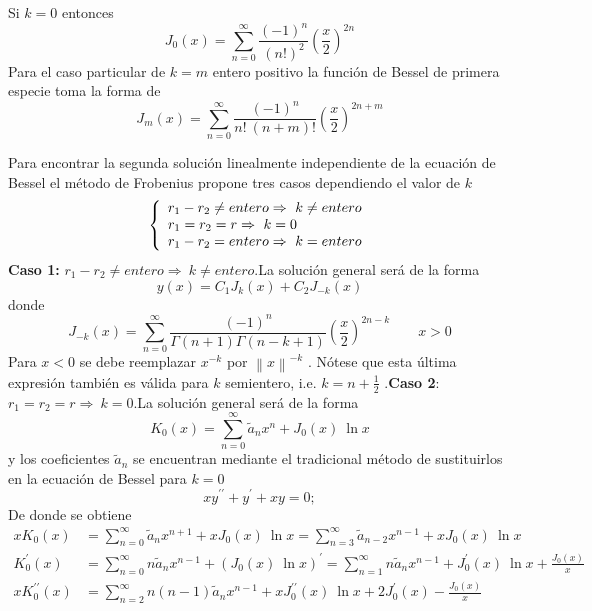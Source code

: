 \documentclass[spanish,notitlepage,letterpaper,12pt]{article}
\begin{document}
Si $k=0$ entonces
\[
J_{0}(x)=\sum_{n=0}^{\infty}\frac{\left(  -1\right)  ^{n}}{\left(  n!\right)
^{2}}\left(  \frac x2\right)  ^{2n}
\]
Para el caso particular de $k=m$ entero positivo la funci\'{o}n de Bessel de
primera especie toma la forma de
\[
J_{m}(x)=\sum_{n=0}^{\infty}\frac{\left(  -1\right)  ^{n}}{n!\ \left(
n+m\right)  !}\left(  \frac x2\right)  ^{2n+m}
\]

Para encontrar la segunda soluci\'{o}n linealmente independiente de la
ecuaci\'{o}n de Bessel el m\'{e}todo de Frobenius propone tres casos
dependiendo el valor de $k$%
\[
\left\{
\begin{array}
[c]{l}%
r_{1}-r_{2}\neq entero\Rightarrow\ k\neq entero\\
r_{1}=r_{2}=r\Rightarrow\ k=0\\
r_{1}-r_{2}=entero\Rightarrow\ k=entero
\end{array}
\right.
\]
\textbf{Caso 1:} $r_{1}-r_{2}\neq entero\Rightarrow\ k\neq entero.$\newline La
soluci\'{o}n general ser\'{a} de la forma
\[
y(x)=C_{1}J_{k}(x)+C_{2}J_{-k}(x)
\]
donde
\[
J_{-k}(x)=\sum_{n=0}^{\infty}\frac{\left(  -1\right)  ^{n}}{\Gamma\left(
n+1\right)  \Gamma\left(  n-k+1\right)  }\left(  \frac x2\right)
^{2n-k}\qquad x>0
\]
Para $x<0$ se debe reemplazar $x^{-k}$ por $\left\|  x\right\|  ^{-k}$ .
N\'{o}tese que esta \'{u}ltima expresi\'{o}n tambi\'{e}n es v\'{a}lida para
$k$ semientero, i.e. $k=n+\frac12$ .\newline \textbf{Caso 2}: $r_{1}%
=r_{2}=r\Rightarrow\ k=0.$\newline La soluci\'{o}n general ser\'{a} de la
forma
\[
K_{0}(x)=\sum_{n=0}^{\infty}\tilde{a}_{n}x^{n}+J_{0}(x)\ \ln x
\]
y los coeficientes $\tilde{a}_{n}$ se encuentran mediante el tradicional
m\'{e}todo de sustituirlos en la ecuaci\'{o}n de Bessel para $k=0$%
\[
xy^{\prime\prime}+y^{\prime}+xy=0;
\]
De donde se obtiene
\begin{align*}
xK_{0}(x)  & =\sum_{n=0}^{\infty}\tilde{a}_{n}x^{n+1}+xJ_{0}(x)\ \ln
x=\sum_{n=3}^{\infty}\tilde{a}_{n-2}x^{n-1}+xJ_{0}(x)\ \ln x\\
K_{0}^{\prime}(x)  & =\sum_{n=0}^{\infty}n\tilde{a}_{n}x^{n-1}+\left(
J_{0}(x)\ \ln x\right)  ^{\prime}=\sum_{n=1}^{\infty}n\tilde{a}_{n}%
x^{n-1}+J_{0}^{\prime}(x)\ \ln x+\frac{J_{0}(x)}x\\
xK_{0}^{\prime\prime}(x)  & =\sum_{n=2}^{\infty}n\left(  n-1\right)  \tilde
{a}_{n}x^{n-1}+xJ_{0}^{\prime\prime}(x)\ \ln x+2J_{0}^{\prime}(x)-\frac
{J_{0}(x)}x
\end{align*}
\end{document}

